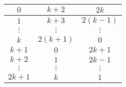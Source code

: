\begin{table}[H]
\begin{minipage}{.3\linewidth}
\begin{tabular}{|c|c|c|}
        $0$ & $k + 2$ & $2k$ \\ \hline
        $1$ & $k + 3$ & $2(k - 1)$ \\ \hline
        $\vdots$ & $\vdots$ & $\vdots$ \\ \hline
        $k$ & $2(k + 1)$ & $0$ \\ \hline
        $k + 1$ & $0$ & $2k + 1$ \\ \hline
        $k + 2$ & $1$ & $2k - 1$ \\ \hline
        $\vdots$ & $\vdots$ & $\vdots$ \\ \hline
        $2k + 1$ & $k$ & $1$ \\ \hline
    \end{tabular}
\end{minipage}
\end{table}
